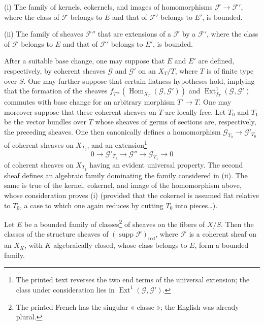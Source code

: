 \medskip
\noindent (i) The family of kernels, cokernels, and images of homomorphisms
$\mathcal F\longrightarrow\mathcal F'$, where the class of $\mathcal F$
belongs to $E$ and that of $\mathcal F'$ belongs to $E'$, is bounded.

\smallskip
\noindent (ii) The family of sheaves $\mathcal F''$ that are extensions of a
$\mathcal F$ by a $\mathcal F'$, where the class of $\mathcal F$ belongs to
$E$ and that of $\mathcal F'$ belongs to $E'$, is bounded.

After a suitable base change, one may suppose that $E$ and $E'$ are defined,
respectively, by coherent sheaves $\mathcal G$ and $\mathcal G'$ on an
$X_T/T$, where $T$ is of finite type over $S$. One may further suppose that
certain flatness hypotheses hold, implying that the formation of the sheaves
$f_{T*}(\operatorname{Hom}_{X_T}(\mathcal G,\mathcal G'))$ and
$\operatorname{Ext}^{1}_{f_T}(\mathcal G,\mathcal G')$ commutes with base
change for an arbitrary morphism $T'\longrightarrow T$. One may moreover
suppose that these coherent sheaves on $T$ are locally free. Let $T_0$ and
$T_1$ be the vector bundles over $T$ whose sheaves of germs of sections are,
respectively, the preceding sheaves. One then canonically defines a
homomorphism $\mathcal G_{T_0}\longrightarrow\mathcal G'_{T_0}$ of coherent
sheaves on $X_{T_0}$, and an extension\footnote{The printed text reverses the two end terms of the universal extension; the class under consideration lies in $\operatorname{Ext}^1(\mathcal G,\mathcal G')$.}
\[
0\longrightarrow\mathcal G'_{T_1}\longrightarrow\mathcal G''
\longrightarrow\mathcal G_{T_1}\longrightarrow0
\]
of coherent sheaves on $X_{T_1}$ having an evident universal property. The
second sheaf defines an algebraic family dominating the family considered in
(ii). The same is true of the kernel, cokernel, and image of the homomorphism
above, whose consideration proves (i) (provided that the cokernel is assumed
flat relative to $T_0$, a case to which one again reduces by cutting $T_0$ into
pieces\ldots).

 Let $E$ be a bounded family of classes\footnote{The printed French has the singular « classe »; the English was already plural.} of sheaves on
the fibers of $X/S$. Then the classes of the structure sheaves of
$(\operatorname{supp}\mathcal F)_{\mathrm{red}}$, where $\mathcal F$ is a
coherent sheaf on an $X_K$, with $K$ algebraically closed, whose class belongs
to $E$, form a bounded family.

